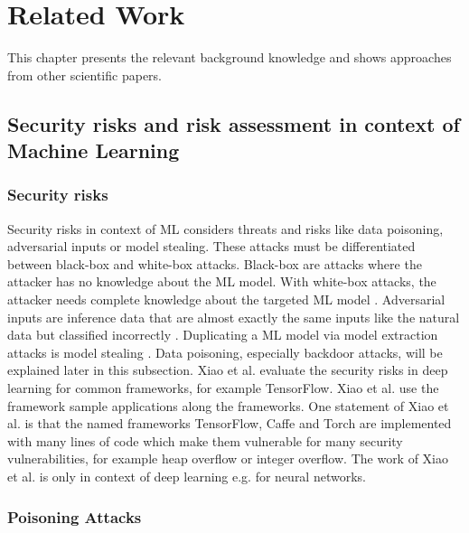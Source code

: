 
\section{Related Work}
\label{sec:relWork}

This chapter presents the relevant background knowledge and shows approaches from other scientific papers.

\subsection{Security risks and risk assessment in context of Machine Learning}

\subsubsection*{Security risks}

Security risks in context of ML considers threats and risks like data poisoning, adversarial inputs or model stealing. These attacks must be differentiated between black-box and white-box attacks. Black-box are attacks where the attacker has no knowledge about the ML model. With white-box attacks, the attacker needs complete knowledge about the targeted ML model \cite{tabassi2019taxonomy}. Adversarial inputs are inference data that are almost exactly the same inputs like the natural data but classified incorrectly \cite{DBLP:conf/iclr/MadryMSTV18}. Duplicating a ML model via model extraction attacks is model stealing \cite{DBLP:conf/acsac/Hu021}. Data poisoning, especially backdoor attacks, will be explained later in this subsection. Xiao et al. \cite{DBLP:conf/sp/XiaoLZX18} evaluate the security risks in
deep learning for common frameworks, for example TensorFlow. Xiao et al. use the framework sample applications along the frameworks. One statement of Xiao et al. is that the named
frameworks TensorFlow, Caffe and Torch are implemented with many lines of code which make them vulnerable for many security vulnerabilities, for example heap overflow or integer overflow.
The work of Xiao et al. is only in context of deep learning e.g. for neural networks.

\subsubsection*{Poisoning Attacks}

